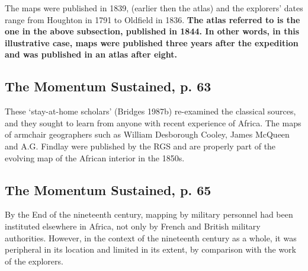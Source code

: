 \documentclass[12pt]{article}
\begin{document}
The maps were published in 1839, (earlier then the atlas) and the explorers'
dates range from Houghton in 1791 to Oldfield in 1836. \textbf{The atlas
referred to is the one in the above subsection, published in 1844. In other
words, in this illustrative case, maps were published three years after the
expedition and was published in an atlas after eight.}

\subsection{The Momentum Sustained, p. 63}
These `stay-at-home scholars' (Bridges 1987b) re-examined the classical sources,
and they sought to learn from anyone with recent experience of Africa. The maps
of armchair geographers such as William Desborough Cooley, James McQueen and
A.G. Findlay were published by the RGS and are properly part of the evolving map
of the African interior in the 1850s.

\subsection{The Momentum Sustained, p. 65}
By the End of the nineteenth century, mapping by military personnel had been
instituted elsewhere in Africa, not only by French and British military
authorities. However, in the context of the nineteenth century as a whole, it
was peripheral in its location and limited in its extent, by comparison with the
work of the explorers. 

\pagebreak



\end{document}
